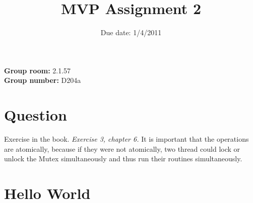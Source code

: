 \documentclass{article}
\title{MVP Assignment 2}
\date{Due date: 1/4/2011}
\begin{document}
\maketitle


\newcommand{\question}[1]{}
\newcommand{\answer}[1]{{#1}}

%
%
\answer{
\begin{flushleft}
{\bf Group room:} 2.1.57\\
{\bf Group number:} D204a
\end{flushleft}
}

\section{Question}

\begin{ExerciseList}
\Exercise Exercise in the book.
\Question \emph{Exercise 3, chapter 6.}
\Answer It is important that the operations are atomically, because if they were not atomically, two thread could lock or unlock the Mutex simultaneously and thus run their routines simultaneously.

\end{ExerciseList}

\section{Hello World}
\end{document}
